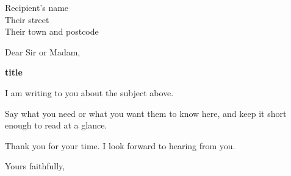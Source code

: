 \documentclass[11pt]{letter}
\date{\today}
\begin{document}
\begin{letter}{Recipient's name \\ Their street \\ Their town and postcode}

\opening{Dear Sir or Madam,}

\textbf{{{title}}}

I am writing to you about the subject above.

Say what you need or what you want them to know here, and keep it short enough to read at a glance.

Thank you for your time. I look forward to hearing from you.

\closing{Yours faithfully,}

\end{letter}
\end{document}
